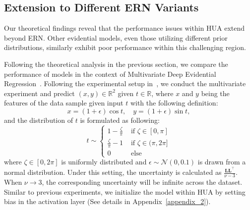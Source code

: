 \subsection{Extension to Different ERN Variants}
Our theoretical findings reveal that the performance issues within HUA extend beyond ERN. Other evidential models, even those utilizing different prior distributions, similarly exhibit poor performance within this challenging region. 

Following the theoretical analysis in the previous section, we compare the performance of models in the context of Multivariate Deep Evidential Regression~\cite{meinert2021multivariate}. Following the experimental setup in~\cite{meinert2021multivariate}, we conduct the multivariate experiment and predict $(x, y) \in \mathbb{R}^2$ given $t \in \mathbb{R}$, where $x$ and $y$ being the features of the data sample given input $t$ with the following definition:
\begin{equation}
x=(1+\epsilon) \cos t, \quad 
y=(1+\epsilon) \sin t,
\end{equation}
and the distribution of $t$ is formulated as following:
\begin{equation}
t \sim \begin{cases}1-\frac{\zeta}{\pi} & \text { if } \zeta \in[0, \pi] \\ \frac{\zeta}{\pi}-1 & \text { if } \zeta \in(\pi, 2 \pi] \\ 0 & \text { else }\end{cases}
\end{equation}
where $\zeta \in[0,2 \pi]$ is uniformly distributed and $\epsilon \sim \mathcal{N}(0,0.1)$ is drawn from a normal distribution. Under this setting, the uncertainty is calculated as $\frac{\boldsymbol{L} \boldsymbol{L}^{\top}}{\nu-3}$. When $\nu\rightarrow3$, the corresponding uncertainty will be infinite across the dataset. Similar to previous experiments, we initialize the model within HUA by setting bias in the activation layer (See details in Appendix~\ref{appendix_2}).





